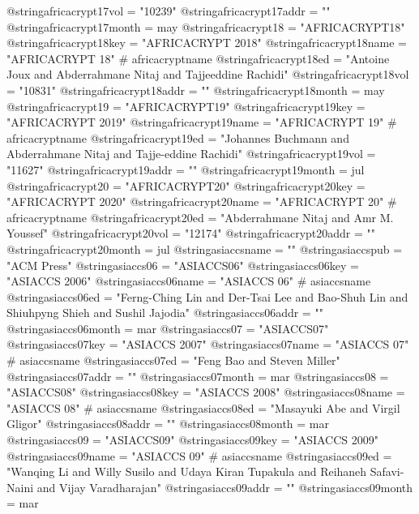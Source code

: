 @string{africacrypt17vol =      "10239"}
@string{africacrypt17addr =     ""}
@string{africacrypt17month =    may}
@string{africacrypt18 =         "AFRICACRYPT18"}
@string{africacrypt18key =      "AFRICACRYPT 2018"}
@string{africacrypt18name =     "AFRICACRYPT 18" # africacryptname}
@string{africacrypt18ed =       "Antoine Joux and Abderrahmane Nitaj and Tajjeeddine Rachidi"}
@string{africacrypt18vol =      "10831"}
@string{africacrypt18addr =     ""}
@string{africacrypt18month =    may}
@string{africacrypt19 =         "AFRICACRYPT19"}
@string{africacrypt19key =      "AFRICACRYPT 2019"}
@string{africacrypt19name =     "AFRICACRYPT 19" # africacryptname}
@string{africacrypt19ed =       "Johannes Buchmann and Abderrahmane Nitaj and Tajje-eddine Rachidi"}
@string{africacrypt19vol =      "11627"}
@string{africacrypt19addr =     ""}
@string{africacrypt19month =    jul}
@string{africacrypt20 =         "AFRICACRYPT20"}
@string{africacrypt20key =      "AFRICACRYPT 2020"}
@string{africacrypt20name =     "AFRICACRYPT 20" # africacryptname}
@string{africacrypt20ed =       "Abderrahmane Nitaj and Amr M. Youssef"}
@string{africacrypt20vol =      "12174"}
@string{africacrypt20addr =     ""}
@string{africacrypt20month =    jul}
@string{asiaccsname =           ""}
@string{asiaccspub =            "{ACM} Press"}
@string{asiaccs06 =             "ASIACCS06"}
@string{asiaccs06key =          "ASIACCS 2006"}
@string{asiaccs06name =         "ASIACCS 06" # asiaccsname}
@string{asiaccs06ed =           "Ferng-Ching Lin and Der-Tsai Lee and Bao-Shuh Lin and Shiuhpyng Shieh and Sushil Jajodia"}
@string{asiaccs06addr =         ""}
@string{asiaccs06month =        mar}
@string{asiaccs07 =             "ASIACCS07"}
@string{asiaccs07key =          "ASIACCS 2007"}
@string{asiaccs07name =         "ASIACCS 07" # asiaccsname}
@string{asiaccs07ed =           "Feng Bao and Steven Miller"}
@string{asiaccs07addr =         ""}
@string{asiaccs07month =        mar}
@string{asiaccs08 =             "ASIACCS08"}
@string{asiaccs08key =          "ASIACCS 2008"}
@string{asiaccs08name =         "ASIACCS 08" # asiaccsname}
@string{asiaccs08ed =           "Masayuki Abe and Virgil Gligor"}
@string{asiaccs08addr =         ""}
@string{asiaccs08month =        mar}
@string{asiaccs09 =             "ASIACCS09"}
@string{asiaccs09key =          "ASIACCS 2009"}
@string{asiaccs09name =         "ASIACCS 09" # asiaccsname}
@string{asiaccs09ed =           "Wanqing Li and Willy Susilo and Udaya Kiran Tupakula and Reihaneh Safavi-Naini and Vijay Varadharajan"}
@string{asiaccs09addr =         ""}
@string{asiaccs09month =        mar}
